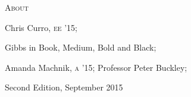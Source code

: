 \documentclass{article}
\begin{document}
\begin{minipage}[t]{0.46\linewidth}
\vspace{0.05in}

\scshape \fontsize{16pt}{16pt}\selectfont {} About
\fontsize{10pt}{10pt}\selectfont
\upshape
\raggedright

\begin{description}
\itemsep1pt
\item[Contributors:] Chris Curro, {\scshape ee '15}; 
\item[Typefaces:] Gibbs in Book, Medium, Bold and Black;
\item[Special Thanks:] Amanda Machnik, {\scshape a '15}; Professor Peter Buckley;
\item[Printing:] Second Edition, September 2015
\end{description}
\end{minipage}
\end{document}
